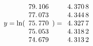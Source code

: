 \documentclass{article}
\begin{document}
\subsection{$y=\ln (%
\protect\begin{array}{c}
79.\,\allowbreak 106\allowbreak \protect \\ 
77.\,\allowbreak 073\protect \\ 
\allowbreak 75.\,\allowbreak 770\protect \\ 
75.\,\allowbreak 053\allowbreak \protect \\ 
\allowbreak 74.\,\allowbreak 679%
\protect\end{array}%
)=\allowbreak 
\protect\begin{array}{c}
4.\,\allowbreak 370\,8\protect \\ 
4.\,\allowbreak 344\,8\protect \\ 
4.\,\allowbreak 327\,7\protect \\ 
4.\,\allowbreak 318\,2\protect \\ 
4.\,\allowbreak 313\,2%
\protect\end{array}%
\allowbreak $}
\end{document}
